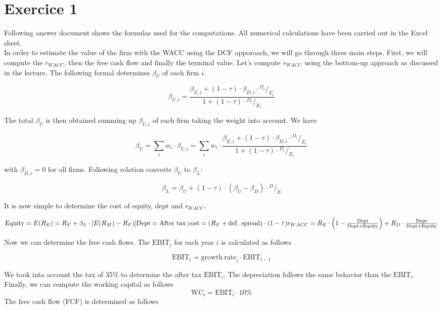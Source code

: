 \documentclass[a4paper,11pt,twoside]{article}
\def \be {\begin{equation}}
\def \ee {\end{equation}}
\begin{document}
\section{Exercice 1}

Following answer document shows the formulas used for the computations. All numerical calculations have been carried out in the Excel sheet. \\

In order to estimate the value of the firm with the WACC using the DCF apporoach, we will go through three main steps. First, we will compute the $r_{WACC}$, then the free cash flow and finally the terminal value. Let's compute $r_{WACC}$ using the bottom-up approach as discussed in the lecture. The following formal determines $\beta_U$ of each firm $i$. 

\be
	{\beta_{U,i}} = \frac{{\beta_{E,i}} + (1-\tau) \cdot {\beta_{D,i}} \cdot {}^{D_i}/_{E_i}}{1 + (1-\tau) \cdot {}^{D_i}/_{E_i}}
\ee

The total $\beta_U$ is then obtained summing up $\beta_{U,i}$ of each firm taking the weight into account. We have

\be
\beta_U = \sum_{i} w_i \cdot {\beta_{U,i}} = \sum_{i} w_i \cdot \frac{{\beta_{E,i}} + (1-\tau) \cdot {\beta_{D,i}} \cdot {}^{D_i}/_{E_i}}{1 + (1-\tau) \cdot {}^{D_i}/_{E_i}}
\ee

with $\beta_{D,i}=0$ for all firms. Following relation converts $\beta_U$ to $\beta_L$:

\be
	\beta_L = \beta_U + (1-\tau) \cdot (\beta_U - \beta_D) \cdot {}^D/_E
\ee

It is now simple to determine the cost of equity, dept and $r_{WACC}$.

\be
\mathrm{Equity}=E(R_E) = R_F + \beta_L \cdot [E(R_M) - R_F)]$$	
$$\mathrm{Dept}=\mathrm{After\ tax\ cost} = (R_F + \mathrm{def.\ spread}) \cdot (1-\tau)$$
$$r_{WACC} = R_E \cdot \left(1 - \frac{\mathrm{Dept}}{\mathrm{Dept + Equity}}\right) + R_D \cdot \frac{\mathrm{Dept}}{\mathrm{Dept + Equity}}
\ee

Now we can determine the free cash flows. The $\mathrm{EBIT}_i$ for each year $i$ is calculated as follows

\be
	\mathrm{EBIT}_i= \mathrm{growth\ rate}_i \cdot \mathrm{EBIT}_{i-1}	
\ee

We took into account the tax of 35\% to determine the after tax $\mathrm{EBIT}_i$. The depreciation follows the same behavior than the $\mathrm{EBIT}_i$. Finally, we can compute the working capital as follows
\be
\mathrm{WC}_i = \mathrm{EBIT}_i \cdot 10\%
\ee
The free cash flow (FCF) is determined as follows
\end{document}
